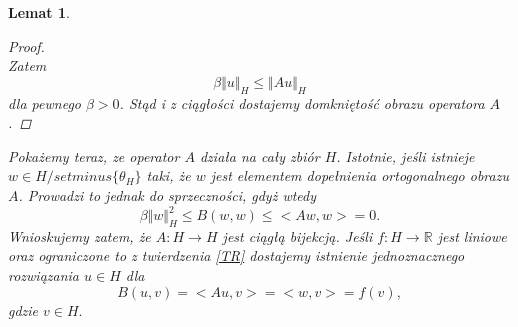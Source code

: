 \documentclass[12pt,a4paper,oneside,titlepage]{article}
\newtheorem{Lemat}{Lemat}
\begin{document}
\begin{Lemat}
\begin{proof}
\begin{equation}
\end{equation}
Zatem
\begin{equation}
\nonumber
\beta \Vert u \Vert_H \leq \Vert Au \Vert_H 
\end{equation}
dla pewnego $\beta >0$. Stąd i z ciągłości dostajemy domkniętość obrazu operatora $A$.
\end{proof}
Pokażemy teraz, ze operator $A$ działa na cały zbiór $H$. Istotnie, jeśli istnieje $w \in H /setminus \lbrace \theta_H \rbrace$ taki, że $w $ jest elementem dopełnienia ortogonalnego obrazu $A$. Prowadzi to jednak do sprzeczności, gdyż wtedy
\begin{equation}
\beta \Vert w \Vert_H^2 \leq B(w,w) \leq <Aw,w> = 0 .
\end{equation}
Wnioskujemy zatem, że $A:H \rightarrow H$ jest ciągłą bijekcją. Jeśli $f: H \rightarrow \mathbb{R}$ jest liniowe oraz ograniczone to z twierdzenia \ref{TR} dostajemy istnienie jednoznacznego rozwiązania $u \in H$ dla
\begin{equation}
B(u,v) = <Au,v> = <w,v> = f(v),
\end{equation}
gdzie $v \in H.$

\end{Lemat}
\end{document}
